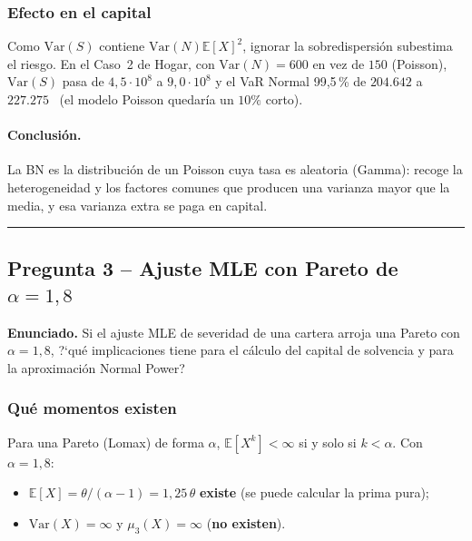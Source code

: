 \documentclass[a4paper,12pt]{article}
\newcommand{\euro}{\texteuro}
\newcommand{\E}{\mathbb{E}}
\newcommand{\Var}{\mathrm{Var}}
\begin{document}
\subsubsection*{Efecto en el capital}
Como $\Var(S)$ contiene $\Var(N)\E[X]^2$, ignorar la sobredispersi\'on subestima el riesgo. En el Caso~2 de Hogar, con $\Var(N)=600$ en vez de $150$ (Poisson), $\Var(S)$ pasa de $4{,}5\cdot10^8$ a $9{,}0\cdot10^8$ y el VaR Normal 99,5\,\% de $204.642$ a $227.275$ \euro\ (el modelo Poisson quedar\'ia un $10\%$ corto).

\paragraph{Conclusi\'on.} La BN es la distribuci\'on de un Poisson cuya tasa es aleatoria (Gamma): recoge la heterogeneidad y los factores comunes que producen una varianza mayor que la media, y esa varianza extra se paga en capital.

\bigskip\hrule\bigskip

\subsection{Pregunta 3 -- Ajuste MLE con Pareto de $\alpha=1{,}8$}

\noindent\textbf{Enunciado.} Si el ajuste MLE de severidad de una cartera arroja una Pareto con $\alpha=1{,}8$, ?`qu\'e implicaciones tiene para el c\'alculo del capital de solvencia y para la aproximaci\'on Normal Power?

\subsubsection*{Qu\'e momentos existen}
Para una Pareto (Lomax) de forma $\alpha$, $\E[X^k]<\infty$ si y solo si $k<\alpha$. Con $\alpha=1{,}8$:
\begin{itemize}[leftmargin=*,itemsep=1pt]
\item $\E[X]=\theta/(\alpha-1)=1{,}25\,\theta$ \textbf{existe} (se puede calcular la prima pura);
\item $\Var(X)=\infty$ y $\mu_3(X)=\infty$ (\textbf{no existen}).
\end{itemize}
\end{document}
